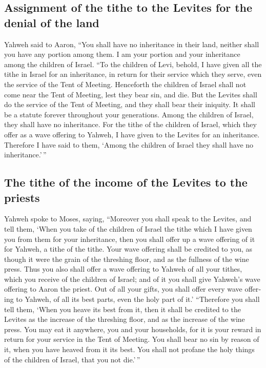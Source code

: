 \begin{paracol}{2}
\begin{otherlanguage}{english}
\hypertarget{assignment-of-the-tithe-to-the-levites-for-the-denial-of-the-land}{%
\subsection{Assignment of the tithe to the Levites for the denial of the
land}\label{assignment-of-the-tithe-to-the-levites-for-the-denial-of-the-land}}

 Yahweh said to Aaron, ``You shall have no inheritance in
their land, neither shall you have any portion among them. I am your
portion and your inheritance among the children of Israel.
 ``To the children of Levi, behold, I have given all the
tithe in Israel for an inheritance, in return for their service which
they serve, even the service of the Tent of Meeting. 
Henceforth the children of Israel shall not come near the Tent of
Meeting, lest they bear sin, and die.  But the Levites
shall do the service of the Tent of Meeting, and they shall bear their
iniquity. It shall be a statute forever throughout your generations.
Among the children of Israel, they shall have no inheritance.
 For the tithe of the children of Israel, which they
offer as a wave offering to Yahweh, I have given to the Levites for an
inheritance. Therefore I have said to them, `Among the children of
Israel they shall have no inheritance.'\,''

\hypertarget{the-tithe-of-the-income-of-the-levites-to-the-priests}{%
\subsection{The tithe of the income of the Levites to the
priests}\label{the-tithe-of-the-income-of-the-levites-to-the-priests}}

 Yahweh spoke to Moses, saying, 
``Moreover you shall speak to the Levites, and tell them, `When you take
of the children of Israel the tithe which I have given you from them for
your inheritance, then you shall offer up a wave offering of it for
Yahweh, a tithe of the tithe.  Your wave offering shall
be credited to you, as though it were the grain of the threshing floor,
and as the fullness of the wine press.  Thus you also
shall offer a wave offering to Yahweh of all your tithes, which you
receive of the children of Israel; and of it you shall give Yahweh's
wave offering to Aaron the priest.  Out of all your
gifts, you shall offer every wave offering to Yahweh, of all its best
parts, even the holy part of it.'  ``Therefore you shall
tell them, `When you heave its best from it, then it shall be credited
to the Levites as the increase of the threshing floor, and as the
increase of the wine press.  You may eat it anywhere, you
and your households, for it is your reward in return for your service in
the Tent of Meeting.  You shall bear no sin by reason of
it, when you have heaved from it its best. You shall not profane the
holy things of the children of Israel, that you not die.'\,''


\end{otherlanguage}
\end{paracol}
